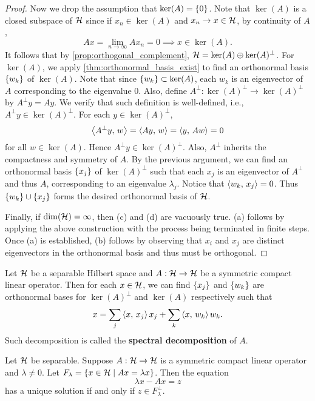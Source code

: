 \begin{proof}
    Now we drop the assumption that $\ker(A) = \left\{ {0} \right\}$. Note that $\ker(A)$ is a 
    closed subspace of $\mathcal{H}$ since if $x_n\in\ker(A)$ and $x_n\to x\in\mathcal{H}$, by continuity 
    of $A$, 
    \begin{equation*}
        Ax = \lim_{n\to\infty} Ax_n = 0
        \implies x\in\ker(A).
    \end{equation*} 
    It follows that by \cref{prop:orthogonal_complement}, $\mathcal{H} = \ker(A)\oplus\ker(A)^\perp$. 
    For $\ker(A)$, we apply \cref{thm:orthonormal_basis_exist} to find an orthonormal 
    basis $\left\{ {w_k} \right\}$ of $\ker(A)$. Note that since $\left\{ {w_k} \right\}\subset \ker(A)$, each 
    $w_k$ is an eigenvector of $A$ corresponding to the eigenvalue $0$. Also, 
    define $A^\perp:\ker(A)^\perp\to\ker(A)^\perp$ by $A^\perp y = Ay$. We verify 
    that such definition is well-defined, i.e., $A^\perp y\in\ker(A)^\perp$. For 
    each $y\in\ker(A)^\perp$,
    \begin{equation*}
        \left\langle {A^\perp y},\, {w} \right\rangle = \left\langle {Ay},\, {w} \right\rangle = \left\langle {y},\, {Aw} \right\rangle = 0
    \end{equation*}
    for all $w\in\ker(A)$. Hence $A^\perp y\in\ker(A)^\perp$. Also, $A^\perp$ inherits 
    the compactness and symmetry of $A$. By the previous argument, we can find an 
    orthonormal basis $\left\{ {x_j} \right\}$ of $\ker(A)^\perp$ such that each $x_j$ is an 
    eigenvector of $A^\perp$ and thus $A$, corresponding to an eigenvalue $\lambda_j$. 
    Notice that $\left\langle {w_k},\, {x_j} \right\rangle = 0$. Thus $\left\{ {w_k} \right\}\cup\left\{ {x_j} \right\}$ forms the desired 
    orthonormal basis of $\mathcal{H}$. 

    Finally, if $\dim(\mathcal{H}) = \infty$, then (c) and (d) are vacuously true. 
    (a) follows by applying the above construction with the process 
    being terminated in finite steps. Once (a) is established, (b) follows 
    by observing that $x_i$ and $x_j$ are distinct eigenvectors in the orthonormal 
    basis and thus must be orthogonal.
\end{proof}

\begin{remark}
    Let $\mathcal{H}$ be a separable Hilbert space and $A:\mathcal{H}\to\mathcal{H}$ be a symmetric compact 
    linear operator. Then for each $x\in\mathcal{H}$, we can find $\left\{ {x_j} \right\}$ and $\left\{ {w_k} \right\}$ 
    are orthonormal bases for $\ker(A)^\perp$ and $\ker(A)$ respectively such that 
    \begin{equation*}
        x = \sum_j\left\langle {x},\, {x_j} \right\rangle x_j + \sum_k\left\langle {x},\, {w_k} \right\rangle w_k.
    \end{equation*}
    Such decomposition is called the \textbf{spectral decomposition} of $A$.
\end{remark}

\begin{theorem}
    Let $\mathcal{H}$ be separable. Suppose $A:\mathcal{H}\to\mathcal{H}$ is a symmetric compact 
    linear operator and $\lambda\neq 0$. Let $F_\lambda = \left\{ x\in\mathcal{H} \;\middle\vert\; Ax = \lambda x \right\}$. 
    Then the equation 
    \begin{equation*}
        \lambda x - Ax = z
    \end{equation*}
    has a unique solution if and only if $z\in F_\lambda^\perp$.
\end{theorem}